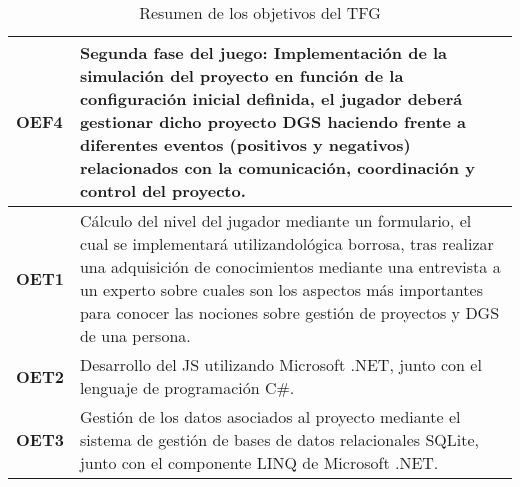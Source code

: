 \begin{table}[htb]
{\begin{tabular}{|l|p{15cm}|}
		\rowcolor[HTML]{FFCE93} 
		{\color[HTML]{000000} \textbf{OEF4}}                                                                   & {\color[HTML]{000000} Segunda fase del juego: Implementación de la simulación del proyecto en función de la configuración inicial definida, el jugador deberá gestionar dicho proyecto DGS haciendo frente a diferentes eventos (positivos y negativos) relacionados con la comunicación, coordinación y control del proyecto.}             \\ \hline
		\rowcolor[HTML]{CBCEFB} 
		{\color[HTML]{000000} \textbf{OET1}}                                                                   & {\color[HTML]{000000} Cálculo del nivel del jugador mediante un formulario, el cual se implementará utilizandológica borrosa, tras realizar una adquisición de conocimientos mediante una entrevista a un experto sobre cuales son los aspectos más importantes para conocer las nociones sobre gestión de proyectos y DGS de una persona.} \\ \hline
		\rowcolor[HTML]{CBCEFB} 
		{\color[HTML]{000000} \textbf{OET2}}                                                                   & {\color[HTML]{000000} Desarrollo del JS utilizando Microsoft .NET, junto con el lenguaje de programación C\#.}                                                                                                                                                                                                                              \\ \hline
		\rowcolor[HTML]{CBCEFB} 
		{\color[HTML]{000000} \textbf{OET3}}                                                                   & {\color[HTML]{000000} Gestión de los datos asociados al proyecto mediante el sistema de gestión de bases de datos relacionales SQLite, junto con el componente LINQ de Microsoft .NET.}                                                                                                                                                     \\ \hline
	\end{tabular}}
	\caption{Resumen de los objetivos del TFG}
	\label{tab:ResumenObjetivos}
\end{table}